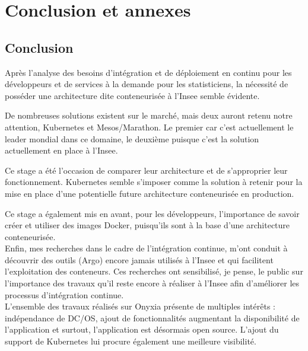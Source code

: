 \documentclass[11pt,fleqn]{book} %
\begin{document}
\part{\textcolor{ocre}{Conclusion et annexes}}
\chapter{Conclusion}
\vspace{-2cm}

Après l'analyse des besoins d'intégration et de déploiement en continu pour les développeurs et de services à la demande pour les statisticiens, la nécessité de posséder une architecture dite conteneurisée à l'Insee semble évidente. \newline

De nombreuses solutions existent sur le marché, mais deux auront retenu notre attention, Kubernetes et Mesos/Marathon. Le premier car c'est actuellement le leader mondial dans ce domaine, le deuxième puisque c'est la solution actuellement en place à l'Insee. \newline

Ce stage a été l'occasion de comparer leur architecture et de s'approprier leur fonctionnement. Kubernetes semble s'imposer comme la solution à retenir pour la mise en place d'une potentielle future architecture conteneurisée en production.\newline

Ce stage a également mis en avant, pour les développeurs, l'importance  de savoir créer et utiliser des images Docker, puisqu'ils sont à la base d'une architecture conteneurisée.\\

Enfin, mes recherches dans le cadre de l'intégration continue, m'ont conduit à découvrir des outils (Argo) encore jamais utilisés à l'Insee et qui facilitent l'exploitation des conteneurs. Ces recherches ont sensibilisé, je pense, le public sur l'importance des travaux qu'il reste encore à réaliser à l'Insee afin d'améliorer les processus d'intégration continue.\\

L'ensemble des travaux réalisés sur Onyxia présente de multiples intérêts : indépendance de DC/OS, ajout de fonctionnalités augmentant la disponibilité de l'application et surtout, l'application est désormais open source. L'ajout du support de Kubernetes lui procure également une meilleure visibilité.\\
\end{document}
